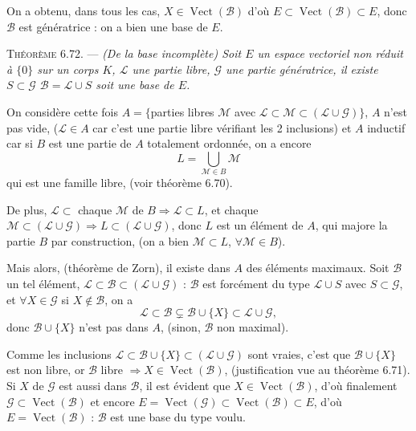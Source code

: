 On a obtenu, dans tous les cas, $X\in\operatorname{Vect}(\mathcal B)$ d'où $E\subset\operatorname{Vect}(\mathcal B)\subset E$, donc $\mathcal B$ est génératrice : on a bien une base de $E$. \bookend

\medskip\noindent\textsc{Théorème 6.72.} --- \emph{(De la base incomplète) Soit $E$ un espace vectoriel non réduit à $\{0\}$ sur un corps $K$, $\mathcal L$ une partie libre, $\mathcal G$ une partie génératrice, il existe $S\subset\mathcal G$  $\mathcal B=\mathcal L\cup S$ soit une base de $E$.}

On considère cette fois $A=\{$parties libres $\mathcal M$ avec $\mathcal L\subset\mathcal M\subset(\mathcal L\cup\mathcal G)\}$, $A$ n'est pas vide, ($\mathcal L\in A$ car c'est une partie libre vérifiant les 2 inclusions) et $A$ inductif car si $B$ est une partie de $A$ totalement ordonnée, on a encore
\[
L=\bigcup_{\mathcal M\in B}\mathcal M
\]
qui est une famille libre, (voir théorème 6.70).

De plus, $\mathcal L\subset$ chaque $\mathcal M$ de $B\Rightarrow\mathcal L\subset L$, et chaque $\mathcal M\subset(\mathcal L\cup\mathcal G)\Rightarrow L\subset(\mathcal L\cup\mathcal G)$, donc $L$ est un élément de $A$, qui majore la partie $B$ par construction, (on a bien $\mathcal M\subset L$, $\forall\mathcal M\in B$).

Mais alors, (théorème de Zorn), il existe dans $A$ des éléments maximaux. Soit $\mathcal B$ un tel élément, $\mathcal L\subset\mathcal B\subset(\mathcal L\cup\mathcal G)$ : $\mathcal B$ est forcément du type $\mathcal L\cup S$ avec $S\subset\mathcal G$, et $\forall X\in\mathcal G$ si $X\notin\mathcal B$, on a
\[
\mathcal L\subset\mathcal B\subsetneq\mathcal B\cup\{X\}\subset\mathcal L\cup\mathcal G,
\]
donc $\mathcal B\cup\{X\}$ n'est pas dans $A$, (sinon, $\mathcal B$ non maximal).

Comme les inclusions $\mathcal L\subset\mathcal B\cup\{X\}\subset(\mathcal L\cup\mathcal G)$ sont vraies, c'est que $\mathcal B\cup\{X\}$ est non libre, or $\mathcal B$ libre $\Rightarrow X\in\operatorname{Vect}(\mathcal B)$, (justification vue au théorème 6.71). Si $X$ de $\mathcal G$ est aussi dans $\mathcal B$, il est évident que $X\in\operatorname{Vect}(\mathcal B)$, d'où finalement $\mathcal G\subset\operatorname{Vect}(\mathcal B)$ et encore $E=\operatorname{Vect}(\mathcal G)\subset\operatorname{Vect}(\mathcal B)\subset E$, d'où $E=\operatorname{Vect}(\mathcal B)$ : $\mathcal B$ est une base du type voulu. \bookend

